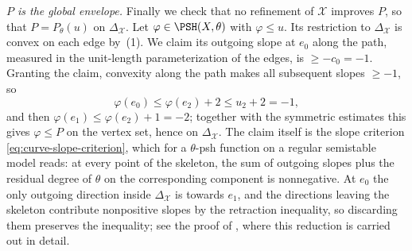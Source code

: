 \begin{example}
\emph{\(P\) is the global envelope.}  Finally we check that no refinement of
\(\mathcal X\) improves \(P\), so that \(P=P_\theta(u)\) on
\(\Delta_{\mathcal X}\).  Let \(\varphi\in\PSH(X,\theta)\) with
\(\varphi\leq u\).  Its restriction to \(\Delta_{\mathcal X}\) is convex on
each edge by \,(1).  We claim its
outgoing slope at \(e_0\) along the path, measured in the unit-length
parameterization of the edges, is \(\geq-c_0=-1\).  Granting the claim,
convexity along the path makes all subsequent slopes \(\geq-1\), so
\[
 \varphi(e_0)\leq\varphi(e_2)+2\leq u_2+2=-1,
\]
and then \(\varphi(e_1)\leq\varphi(e_2)+1=-2\); together with the symmetric
estimates this gives \(\varphi\leq P\) on the vertex set, hence on
\(\Delta_{\mathcal X}\).  The claim itself is the slope criterion
\eqref{eq:curve-slope-criterion}, which for a \(\theta\)-psh function on a
regular semistable model reads: at every point of the skeleton, the sum of
outgoing slopes plus the residual degree of \(\theta\) on the corresponding
component is nonnegative.  At \(e_0\) the only outgoing direction inside
\(\Delta_{\mathcal X}\) is towards \(e_1\), and the directions leaving the
skeleton contribute nonpositive slopes by the retraction inequality, so
discarding them preserves the inequality; see the proof of
, where this reduction is
carried out in detail.
\end{example}

